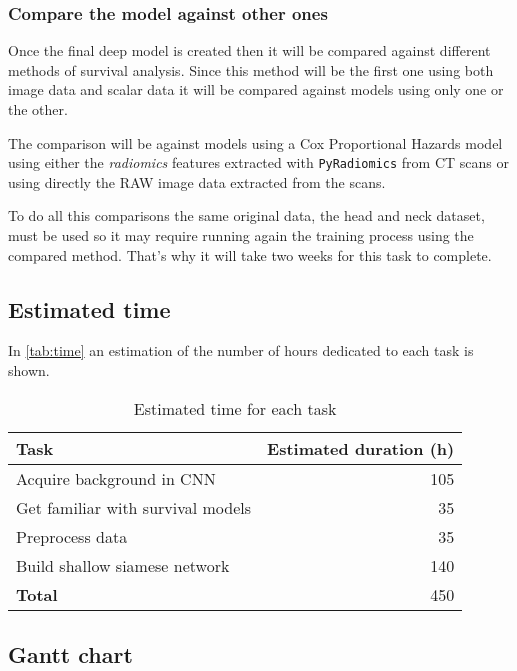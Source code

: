 \subsubsection{Compare the model against other ones}

Once the final deep model is created then it will be compared against different methods of 
survival analysis. Since this method will be the first one using both image data and scalar 
data it will be compared against models using only one or the other. 

The comparison will be against models using a Cox Proportional Hazards model using either
the \emph{radiomics} features extracted with \texttt{PyRadiomics} from CT scans or using 
directly the RAW image data extracted from the scans.

To do all this comparisons the same original data, the head and neck dataset, must be 
used so it may require running again the training process using the compared method. 
That's why it will take two weeks for this task to complete.

\subsection{Estimated time}

In \autoref{tab:time} an estimation of the number of hours dedicated to each task is shown.

\begin{table}
  \centering{}
  \begin{tabular}{|l|r|}
    \hline
    Task & Estimated duration (h) \\ \hline \hline
    Acquire background in CNN & 105 \\ \hline
    Get familiar with survival models & 35 \\ \hline
    Preprocess data & 35 \\ \hline
    Build shallow siamese network & 140 \\
  
    \hline \hline
    \textbf{Total} & 450 \\
    \hline
  \end{tabular}
  \caption{Estimated time for each task \label{tab:time}}
\end{table}

\subsection{Gantt chart}

